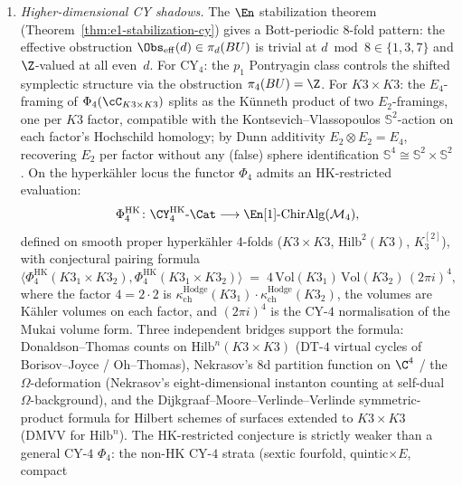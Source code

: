 \begin{enumerate}[label=\textup{(\roman*)}]
 Hall positive-half descent diagram of local CoHAs; transition maps are
 MC gauge equivalences across walls. Proved for toric CY$_3$
 (Theorem~\ref{thm:toric-chart-gluing}); open for compact
 CY$_3$ beyond the chart-atlas regime, where the number of
 charts may be infinite and the homotopy limit requires a
 convergence argument.
\item \emph{Higher-dimensional CY shadows.}
 The $\En$ stabilization theorem
 (Theorem~\ref{thm:e1-stabilization-cy}) gives a
 Bott-periodic 8-fold pattern: the effective obstruction
 $\Obs_{\mathrm{eff}}(d) \in \pi_d(BU)$ is trivial at
 $d \bmod 8 \in \{1, 3, 7\}$ and $\Z$-valued at all even~$d$.
 For CY$_4$: the $p_1$ Pontryagin class controls the shifted
 symplectic structure via the obstruction
 $\pi_4(BU) = \Z$. For $K3 \times K3$: the $E_4$-framing of
 $\Phi_4(\cC_{K3 \times K3})$ splits as the K\"unneth product
 of two $E_2$-framings, one per $K3$ factor, compatible with
 the Kontsevich--Vlassopoulos $\mathbb{S}^2$-action on each
 factor's Hochschild homology; by Dunn additivity
 $E_2 \otimes E_2 = E_4$, recovering $E_2$ per factor without
 any (false) sphere identification
 $\mathbb{S}^4 \cong \mathbb{S}^2 \times \mathbb{S}^2$.
 On the hyperk\"ahler locus the functor $\Phi_4$ admits an
 HK-restricted evaluation:
 \[
 \Phi_4^{\mathrm{HK}}\colon
 \CY_4^{\mathrm{HK}}\text{-}\Cat
 \longrightarrow
 \En[1]\text{-}\mathrm{ChirAlg}(\cM_4),
 \]
 defined on smooth proper hyperk\"ahler 4-folds
 ($K3\times K3$, $\mathrm{Hilb}^2(K3)$, $K_3^{[2]}$), with
 conjectural pairing formula
 \[
 \langle\Phi_4^{\mathrm{HK}}(K3_1\times K3_2),
 \Phi_4^{\mathrm{HK}}(K3_1\times K3_2)\rangle
 \;=\;
 4\,\mathrm{Vol}(K3_1)\,\mathrm{Vol}(K3_2)\,(2\pi i)^4,
 \]
 where the factor $4 = 2 \cdot 2$ is $\kappa_{\mathrm{ch}}^{\mathrm{Hodge}}(K3_1)\cdot
 \kappa_{\mathrm{ch}}^{\mathrm{Hodge}}(K3_2)$, the volumes are K\"ahler volumes on
 each factor, and $(2\pi i)^4$ is the CY-$4$ normalisation of the
 Mukai volume form. Three independent bridges support the formula:
 Donaldson--Thomas counts on $\mathrm{Hilb}^n(K3\times K3)$ (DT-$4$
 virtual cycles of Borisov--Joyce / Oh--Thomas), Nekrasov's $8$d
 partition function on $\C^4$ / the $\Omega$-deformation (Nekrasov's
 eight-dimensional instanton counting at self-dual
 $\Omega$-background), and the Dijkgraaf--Moore--Verlinde--Verlinde
 symmetric-product formula for Hilbert schemes of surfaces extended
 to $K3\times K3$ (DMVV for $\mathrm{Hilb}^n$). The HK-restricted
 conjecture is strictly weaker than a general CY-$4$ $\Phi_4$: the
 non-HK CY-$4$ strata (sextic fourfold, quintic$\times E$, compact

\end{enumerate}
